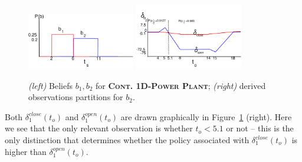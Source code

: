 \documentclass{article} %
\newcommand{\open}{\mathit{open}}
\newcommand{\close}{\mathit{close}}
\begin{document}
\begin{figure}[tbp!]
\vspace{-3mm}
\centering
\hspace{-20mm}
\includegraphics[width=0.42\textwidth]{pics/beliefs_2.pdf}
\hspace{10mm}
\includegraphics[width=0.42\textwidth]{pics/delta_b2_2.pdf}
\hspace{-17mm}
\vspace{-2mm}
\caption{\footnotesize 
{\it (left)} Beliefs $b_1,b_2$ for \textsc{\bf Cont. 1D-Power Plant}; 
{\it (right)} derived observations partitions for $b_2$.
}
\label{fig:beliefs}
\end{figure}

Both $\delta^{\close}_1(t_o)$ and $\delta^{\open}_1(t_o)$ are drawn graphically
in Figure~\ref{fig:beliefs} (right).  Here we see that the only relevant
observation is whether $t_o < 5.1$ or not -- this is the only distinction
that determines whether the policy associated with 
$\delta^{\close}_1(t_o)$ is higher than $\delta^{\open}_1(t_o)$.

\end{document}
